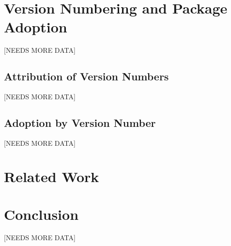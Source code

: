 \documentclass[10pt,conference]{IEEEtran}
\begin{document}
  \section{Version Numbering and Package Adoption}
  [NEEDS MORE DATA]

  \subsection{Attribution of Version Numbers}
  [NEEDS MORE DATA]

  \subsection{Adoption by Version Number}
  [NEEDS MORE DATA]

  \section{Related Work}

  \section{Conclusion}
  [NEEDS MORE DATA]
\end{document}
